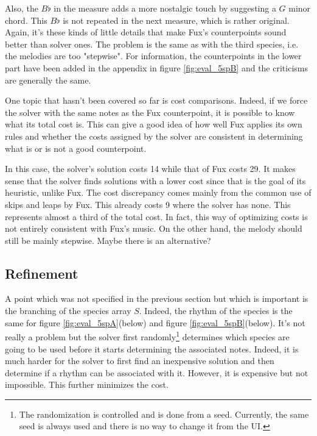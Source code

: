 Also, the $B\flat$ in the  measure adds a more nostalgic touch by suggesting a $G$ minor chord. This $B\flat$ is not repeated in the next measure, which is rather original. Again, it's these kinds of little details that make Fux's counterpoints sound better than solver ones. The problem is the same as with the third species, i.e. the melodies are too "stepwise". For information, the counterpoints in the lower part have been added in the appendix in figure \ref{fig:eval_5spB} and the criticisms are generally the same.

One topic that hasn't been covered so far is cost comparisons. Indeed, if we force the solver with the same notes as the Fux counterpoint, it is possible to know what its total cost is. This can give a good idea of how well Fux applies its own rules and whether the costs assigned by the solver are consistent in determining what is or is not a good counterpoint.

In this case, the solver's solution costs 14 while that of Fux costs 29. It makes sense that the solver finds solutions with a lower cost since that is the goal of its heuristic, unlike Fux. The cost discrepancy comes mainly from the common use of skips and leaps by Fux. This already costs 9 where the solver has none. This represents almost a third of the total cost. In fact, this way of optimizing costs is not entirely consistent with Fux's music. On the other hand, the melody should still be mainly stepwise. Maybe there is an alternative?


\subsection{Refinement}\label{sec:5sp_refine}
A point which was not specified in the previous section but which is important is the branching of the species array $S$.
Indeed, the rhythm of the species is the same for figure \ref{fig:eval_5spA}(below) and figure \ref{fig:eval_5spB}(below). It's not really a problem but the solver first randomly\footnote{The randomization is controlled and is done from a seed. Currently, the same seed is always used and there is no way to change it from the UI.} determines which species are going to be used before it starts determining the associated notes. Indeed, it is much harder for the solver to first find an inexpensive solution and then determine if a rhythm can be associated with it. However, it is expensive but not impossible. This further minimizes the cost.

